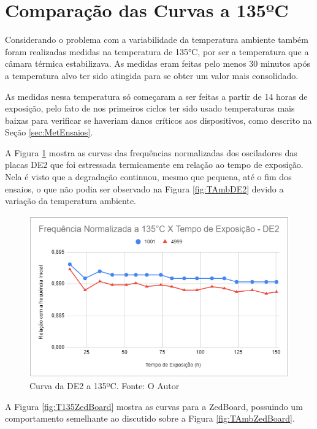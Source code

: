 \section{Comparação das Curvas a 135ºC}
\label{sec:ResT135}

Considerando o problema com a variabilidade da temperatura ambiente também foram realizadas medidas na temperatura de 135°C, por ser a temperatura que a câmara térmica estabilizava. As medidas eram feitas pelo menos 30 minutos após a temperatura alvo ter sido atingida para se obter um valor mais consolidado.

As medidas nessa temperatura só começaram a ser feitas a partir de 14 horas de exposição, pelo fato de nos primeiros ciclos ter sido usado temperaturas mais baixas para verificar se haveriam danos críticos aos dispositivos, como descrito na Seção \ref{sec:MetEnsaios}.

A Figura \ref{fig:T135DE2} mostra as curvas das frequências normalizadas dos osciladores das placas  DE2 que foi estressada termicamente em relação ao tempo de exposição. Nela é visto que a degradação continuou, mesmo que pequena, até o fim dos ensaios, o que não podia ser observado na Figura \ref{fig:TAmbDE2} devido a variação da temperatura ambiente.

\begin{figure}[H]
    \centering
    \includegraphics[scale=0.75]{figures/Resultados/T135DE2}
    \caption{Curva da DE2 a 135ºC. Fonte: O Autor}
    \label{fig:T135DE2}
\end{figure}

A Figura \ref{fig:T135ZedBoard} mostra as curvas para a ZedBoard, possuindo um comportamento semelhante ao discutido sobre a Figura \ref{fig:TAmbZedBoard}.

